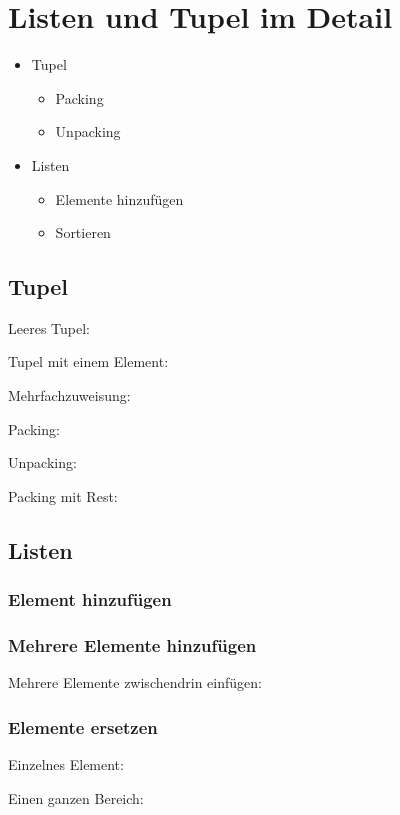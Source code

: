 \section{Listen und Tupel im Detail}
\begin{itemize}
	\item Tupel
	\begin{itemize}
		\item Packing
		\item Unpacking
	\end{itemize}
	\item Listen
	\begin{itemize}
		\item Elemente hinzufügen
		\item Sortieren
	\end{itemize}
\end{itemize}

\subsection{Tupel}
Leeres Tupel:

Tupel mit einem Element:

Mehrfachzuweisung:

\begin{multicols}{2}
	Packing:
	
	\columnbreak
	Unpacking:
	
	\vfill\null
\end{multicols}
Packing mit Rest:


\subsection{Listen}

\subsubsection{Element hinzufügen}


\subsubsection{Mehrere Elemente hinzufügen}

Mehrere Elemente zwischendrin einfügen:


\subsubsection{Elemente ersetzen}

Einzelnes Element:

Einen ganzen Bereich:


